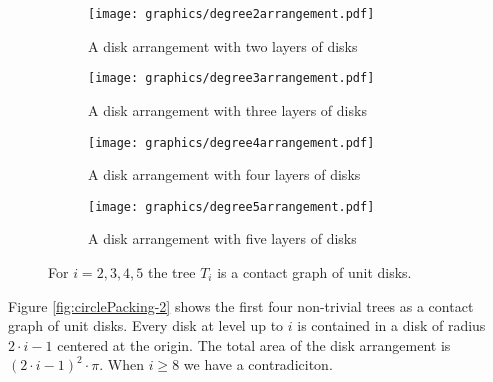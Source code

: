 \documentclass[10pt]{CSUNthesis}
\theoremstyle{plain}%
\theoremstyle{definition}
\theoremstyle{remark}
\begin{document}
\begin{figure}[!htpb]\label{fig:circlePacking-2}
\begin{center}
  \begin{subfigure}[b]{0.24\textwidth}
	  \texttt{[image: graphics/degree2arrangement.pdf]}
	  \caption{A disk arrangement with two layers of disks}
	  \label{fig:circlePacking2-1}
  \end{subfigure}
  \begin{subfigure}[b]{0.24\textwidth}
	  \texttt{[image: graphics/degree3arrangement.pdf]}
	  \caption{A disk arrangement with three layers of disks}
	  \label{fig:circlePacking2-2}
  \end{subfigure}
  \begin{subfigure}[b]{0.24\textwidth}
	  \texttt{[image: graphics/degree4arrangement.pdf]}
	  \caption{A disk arrangement with four layers of disks}
	  \label{fig:circlePacking2-3}
  \end{subfigure}
  \begin{subfigure}[b]{0.24\textwidth}
	  \texttt{[image: graphics/degree5arrangement.pdf]}
	  \caption{A disk arrangement with five layers of disks}
	  \label{fig:circlePacking2-4}
  \end{subfigure}
\end{center} 
\caption{For $i=2,3,4,5$ the tree $T_i$ is a contact graph of unit disks.}
\end{figure}
Figure \ref{fig:circlePacking-2} shows the first four non-trivial trees as a contact graph of unit disks.
Every disk at level up to $i$ is contained in a disk of radius $2\cdot i - 1$ centered at the origin.
The total area of the disk arrangement is $(2\cdot i -1)^2 \cdot \pi$. 
When $i\geq 8$ we have a contradiciton.%
\end{document}
